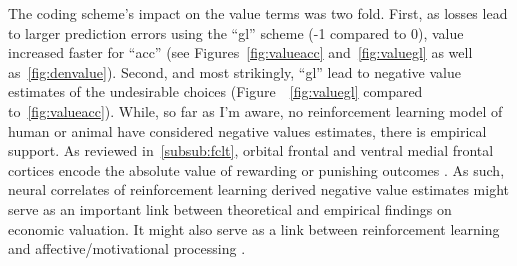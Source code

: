 \documentclass[doc,12pt]{apa}        %
\begin{document}
The coding scheme's impact on the value terms was two fold.  First, as losses lead to larger prediction errors using the ``gl'' scheme (-1 compared to 0), value increased faster for ``acc'' (see Figures~\ref{fig:valueacc} and~\ref{fig:valuegl} as well as~\ref{fig:denvalue}).  Second, and most strikingly, ``gl'' lead to negative value estimates of the undesirable choices (Figure~~\ref{fig:valuegl} compared to~\ref{fig:valueacc}).  While, so far as I'm aware, no reinforcement learning model of human or animal have considered negative values estimates, there is empirical support.  As reviewed in~\ref{subsub:fclt}, orbital frontal and ventral medial frontal cortices encode the absolute value of rewarding or punishing outcomes \cite{ODoherty:2001p2423,Hornak:2004p6234}.  As such, neural correlates of reinforcement learning derived negative value estimates might serve as an important link between theoretical and empirical findings on economic valuation.  It might also serve as a link between reinforcement learning and affective/motivational processing \cite{Knutson:2005p1627,Delgado:2004p6665}.
\end{document}
